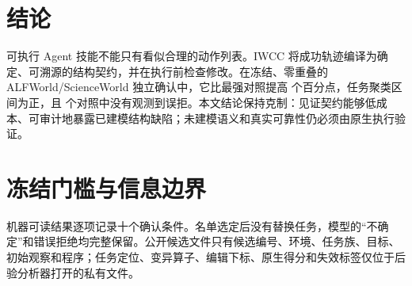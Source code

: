 \documentclass[10pt]{article}
\begin{document}
\section{结论}
可执行 Agent 技能不能只有看似合理的动作列表。IWCC 将成功轨迹编译为确定、可溯源的结构契约，并在执行前检查修改。在冻结、零重叠的 ALFWorld/ScienceWorld 独立确认中，它比最强对照提高 \GainPoints{} 个百分点，任务聚类区间为正，且 \ControlCount{} 个对照中没有观测到误拒。本文结论保持克制：见证契约能够低成本、可审计地暴露已建模结构缺陷；未建模语义和真实可靠性仍必须由原生执行验证。




\appendix
\section{冻结门槛与信息边界}
机器可读结果逐项记录十个确认条件。名单选定后没有替换任务，模型的“不确定”和错误拒绝均完整保留。公开候选文件只有候选编号、环境、任务族、目标、初始观察和程序；任务定位、变异算子、编辑下标、原生得分和失效标签仅位于后验分析器打开的私有文件。
\end{document}
